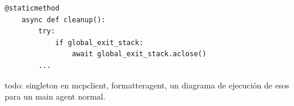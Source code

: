 \begin{lstlisting}[caption={Función \textit{cleanup en Cliente MCP}},label={lst:clean}]
    @staticmethod
    async def cleanup():
        try:
            if global_exit_stack:
                await global_exit_stack.aclose()
        ...

\end{lstlisting}















todo: singleton en mcpclient, formatteragent, un diagrama de ejecución de esos para un main agent normal.
